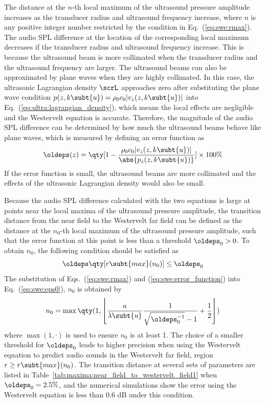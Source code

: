 The distance at the $n$\mbox{-th} local maximum of the ultrasound pressure amplitude increases as the transducer radius and ultrasound frequency increase, 
where $n$ is any positive integer number restricted by the condition in Eq.~(\ref{eq:swe:rmax}). 
The audio SPL difference at the location of the corresponding local maximum decreases if the transducer radius and ultrasound frequency increase. 
This is because the ultrasound beam is more collimated when the transducer radius and the ultrasound frequency are larger. 
The ultrasound beams can also be approximated by plane waves when they are highly collimated. 
In this case, the ultrasonic Lagrangian density $\scrL$ approaches zero after substituting the plane wave condition $p(z,k\subt{u}) = \rho_0c_0|v_z(z,k\subt{u})|$  into Eq.~(\ref{eq:ultra:lagrangian_density}), 
which means the local effects are negligible and the Westervelt equation is accurate. 
Therefore, the magnitude of the audio SPL difference can be determined by how much the ultrasound beams behave like plane waves, 
which is measured by defining an error function as
\begin{equation}
    \oldeps(z) = 
    \qty[1-\frac{\rho_0c_0 |v_z(z,k\subt{u})|}{\abs{p_z(z,k\subt{u})}}]
    \times 
    100\%
    \label{eq:swe:error_function}
\end{equation}
If the error function is small, the ultrasound beams are more collimated and the effects of the ultrasonic Lagrangian density would also be small.

Because the audio SPL difference calculated with the two equations is large at points near the local maxima of the ultrasound pressure amplitude, 
the transition distance from the near field to the Westervelt far field can be defined as the distance at the $n_0$\mbox{-th} local maximum of the ultrasound pressure amplitude, 
such that the error function at this point is less than a threshold $\oldeps_0 > 0$. 
To obtain $n_0$, the following condition should be satisfied as
\begin{equation}
    \oldeps\qty[r\subt{max}(n_0)]
    \leq \oldeps_0
    \label{eq:swe:eps0}
\end{equation}
The substitution of Eqs.~(\ref{eq:swe:rmax}) and (\ref{eq:swe:error_function}) into Eq.~(\ref{eq:swe:eps0}), $n_0$ is obtained by
\begin{equation}
    n_0
    =
    \max\qty(1,
    \left\lfloor
    \frac{a}{\lambda\subt{u}} \frac{1}{\sqrt{\oldeps_0^{-1}} - 1} + \frac{1}{2}\right \rfloor)
\end{equation}
where $\max(1, \cdot)$ is used to ensure $n_0$ is at least 1. 
The choice of a smaller threshold for $\oldeps_0$ leads to higher precision when using the Westervelt equation to predict audio sounds in the Westervelt far field, 
region $r\geq r\subt{max}(n_0)$. 
The transition distance at several sets of parameters are listed in Table~\ref{tab:maxima:near_field_to_westervelt_field1} when $\oldeps_0 = 2.5\%$, 
and the numerical simulations show the error using the Westervelt equation is less than 0.6 dB under this condition.

